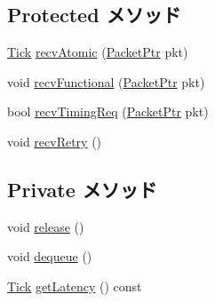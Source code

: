 \subsection*{Protected メソッド}
\begin{DoxyCompactItemize}
\item 
\hyperlink{base_2types_8hh_a5c8ed81b7d238c9083e1037ba6d61643}{Tick} \hyperlink{classSimpleMemory_a5f0b4c4a94f6b0053f9d7a4eb9c2518a}{recvAtomic} (\hyperlink{classPacket}{PacketPtr} pkt)
\item 
void \hyperlink{classSimpleMemory_aeefa907fb6d6a787e6dab90e8138ea90}{recvFunctional} (\hyperlink{classPacket}{PacketPtr} pkt)
\item 
bool \hyperlink{classSimpleMemory_a3344d9dd0f83257feab5424e761f31c6}{recvTimingReq} (\hyperlink{classPacket}{PacketPtr} pkt)
\item 
void \hyperlink{classSimpleMemory_a29cb5a4f98063ce6e9210eacbdb35298}{recvRetry} ()
\end{DoxyCompactItemize}
\subsection*{Private メソッド}
\begin{DoxyCompactItemize}
\item 
void \hyperlink{classSimpleMemory_a23b477d0e2d399f75d585d154c346591}{release} ()
\item 
void \hyperlink{classSimpleMemory_a851b6644e3e336c07f8e6fe77234b97f}{dequeue} ()
\item 
\hyperlink{base_2types_8hh_a5c8ed81b7d238c9083e1037ba6d61643}{Tick} \hyperlink{classSimpleMemory_aab331854844f48e55c064a1d20d74361}{getLatency} () const 
\end{DoxyCompactItemize}
